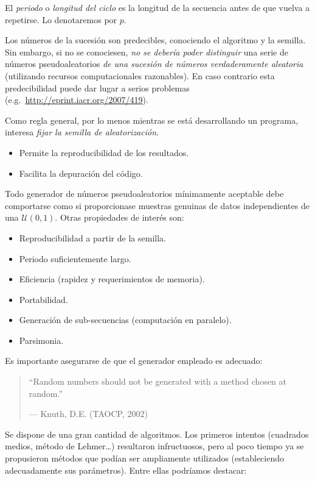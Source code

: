 \documentclass[
]{book}
\theoremstyle{break}
\theoremstyle{definition}
\theoremstyle{definition}
\theoremstyle{definition}
\theoremstyle{definition}
\theoremstyle{remark}
\begin{document}
El \emph{periodo} o \emph{longitud del ciclo} es la longitud de la secuencia antes de que vuelva a repetirse. Lo denotaremos por \(p\).

Los números de la sucesión son predecibles, conociendo el algoritmo y la semilla.
Sin embargo, si no se conociesen, \emph{no se debería poder distinguir} una serie de números pseudoaleatorios \emph{de una sucesión de números verdaderamente aleatoria} (utilizando recursos computacionales razonables).
En caso contrario esta predecibilidad puede dar lugar a serios
problemas (e.g.~\url{http://eprint.iacr.org/2007/419}).

Como regla general, por lo menos mientras se está desarrollando un
programa, interesa \emph{fijar la semilla de aleatorización}.

\begin{itemize}
\item
  Permite la reproducibilidad de los resultados.
\item
  Facilita la depuración del código.
\end{itemize}

Todo generador de números pseudoaleatorios mínimamente aceptable debe comportarse como si proporcionase muestras genuinas de datos independientes de una \(\mathcal{U}(0,1)\).
Otras propiedades de interés son:

\begin{itemize}
\item
  Reproducibilidad a partir de la semilla.
\item
  Periodo suficientemente largo.
\item
  Eficiencia (rapidez y requerimientos de memoria).
\item
  Portabilidad.
\item
  Generación de sub-secuencias (computación en paralelo).
\item
  Parsimonia.
\end{itemize}

Es importante asegurarse de que el generador empleado es adecuado:

\begin{quote}
``Random numbers should not be generated with a method chosen at random.''

--- Knuth, D.E. (TAOCP, 2002)
\end{quote}

Se dispone de una gran cantidad de algoritmos.
Los primeros intentos (cuadrados medios, método de Lehmer\ldots) resultaron infructuosos, pero al poco tiempo ya se propusieron métodos que podían ser ampliamente utilizados (estableciendo adecuadamente sus parámetros).
Entre ellas podríamos destacar:
\end{document}
